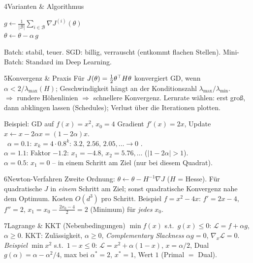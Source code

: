 \begin{hngrid}
\begin{hnp}[raster multicolumn=3,acc=hnnavy]{4}{Varianten \& Algorithmus}
\begin{pcode}
\hii $g\leftarrow\frac1{|\mathcal B|}\sum_{i\in\mathcal B}\nabla J^{(i)}(\theta)$\\
\hii $\theta\leftarrow\theta-\alpha\,g$
\end{pcode}
Batch: stabil, teuer. SGD: billig, verrauscht (entkommt flachen Stellen). Mini-Batch: Standard im Deep Learning.
\end{hnp}
%
\begin{hnp}[raster multicolumn=3,acc=hngreen]{5}{Konvergenz \& Praxis}
Für $J(\theta)=\frac12\theta^{\top} H\theta$ konvergiert GD, wenn $\alpha<2/\lambda_{\max}(H)$; Geschwindigkeit hängt an der Konditionszahl $\lambda_{\max}/\lambda_{\min}$.\\
 $\Rightarrow$ rundere Höhenlinien $\Rightarrow$ schnellere Konvergenz. Lernrate wählen: erst groß, dann abklingen lassen (Schedules); Verlust über die Iterationen plotten.
\end{hnp}
%
\begin{hnex}[raster multicolumn=3]{Beispiel: GD auf $f(x)=x^2$, $x_0=4$}
Gradient $f'(x)=2x$, Update $x\leftarrow x-2\alpha x=(1-2\alpha)x$.\\
\hnsol\ $\alpha=0.1$: $x_k=4\cdot0.8^k$: $3.2,\,2.56,\,2.05,\dots\to0$ .\\
$\alpha=1.1$: Faktor $-1.2$: $x_1=-4.8$, $x_2=5.76,\dots$  ($|1-2\alpha|>1$).\\
$\alpha=0.5$: $x_1=0$ -- in einem Schritt am Ziel (nur bei diesem Quadrat).
\end{hnex}
%
\begin{hnp}[raster multicolumn=3,acc=hnrose]{6}{Newton-Verfahren}
Zweite Ordnung: $\theta\leftarrow\theta-H^{-1}\nabla J$ ($H$ = Hesse). Für quadratische $J$ in \emph{einem} Schritt am Ziel; sonst quadratische Konvergenz nahe dem Optimum. Kosten $O(d^3)$ pro Schritt. Beispiel $f=x^2-4x$: $f'=2x-4$, $f''=2$, $x_1=x_0-\frac{2x_0-4}{2}=2$ (Minimum) für \emph{jedes} $x_0$.
\end{hnp}
%
\begin{hnp}[raster multicolumn=6,acc=hnpurple]{7}{Lagrange \& KKT (Nebenbedingungen)}
$\min f(x)$ s.t.\ $g(x)\le0$: $\mathcal L=f+\alpha g$, $\alpha\ge0$. KKT: Zulässigkeit, $\alpha\ge0$, \emph{Complementary Slackness} $\alpha g=0$, $\nabla_x\mathcal L=0$.\\
\emph{Beispiel} $\min x^2$ s.t.\ $1-x\le0$: $\mathcal L=x^2+\alpha(1-x)$, $x=\alpha/2$, Dual $g(\alpha)=\alpha-\alpha^2/4$, max bei $\alpha^*=2$, $x^*=1$, Wert $1$ (Primal $=$ Dual).
\end{hnp}

\end{hngrid}
